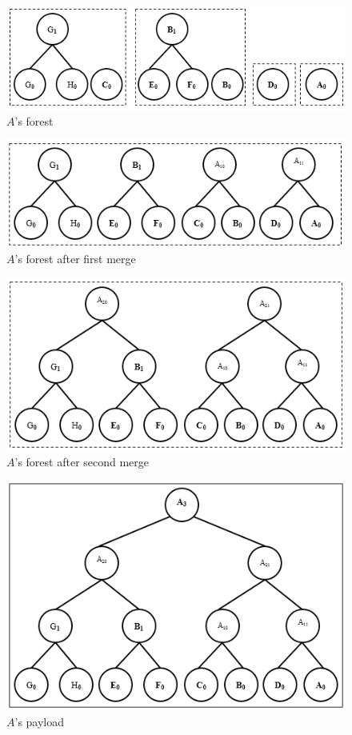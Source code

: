 		\begin{figure}[h!]
			\centering
			\includegraphics[scale=1]{images/a-forest.png}
			\caption{$A$'s forest}
			\label{fig:a-forest}
		\end{figure}
		\begin{figure}[h!]
			\centering
			\includegraphics[scale=1]{images/a-forest-first-merge.png}
			\caption{$A$'s forest after first merge}
			\label{fig:a-forest-first-merge}
		\end{figure}
		\begin{figure}[h!]
			\centering
			\includegraphics[scale=1]{images/a-forest-second-merge.png}
			\caption{$A$'s forest after second merge}
			\label{fig:a-forest-second-merge}
		\end{figure}
		\begin{figure}[h!]
			\centering
			\includegraphics[scale=1]{images/a-payload.png}
			\caption{$A$'s payload}
			\label{fig:a-payload}
		\end{figure}

